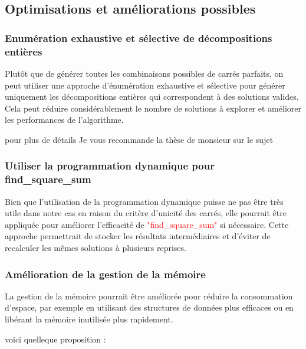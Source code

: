 \documentclass{article}
\begin{document}
\subsection{Optimisations et améliorations possibles }

\subsubsection{Enumération exhaustive et sélective de décompositions entières}
Plutôt que de générer toutes les combinaisons possibles de carrés parfaits, on peut utiliser une approche d'énumération exhaustive et sélective pour générer uniquement les décompositions entières qui correspondent à des solutions valides. Cela peut réduire considérablement le nombre de solutions à explorer et améliorer les performances de l'algorithme.\newline

pour plus de détails Je vous recommande la thèse de monsieur \citet{Gambini1999} sur le sujet\newline

\subsubsection{Utiliser la programmation dynamique pour find\_square\_sum}

 Bien que l'utilisation de la programmation dynamique puisse ne pas être très utile dans notre cas en raison du critère d'unicité des carrés, elle pourrait être appliquée pour améliorer l'efficacité de \textcolor{red}{"find\_square\_sum"} si nécessaire. Cette approche permettrait de stocker les résultats intermédiaires et d'éviter de recalculer les mêmes solutions à plusieurs reprises.\newline
 
\subsubsection{Amélioration de la gestion de la mémoire}

La gestion de la mémoire pourrait être améliorée pour réduire la consommation d'espace, par exemple en utilisant des structures de données plus efficaces ou en libérant la mémoire inutilisée plus rapidement.\newline

voici quelleque proposition :
\end{document}
